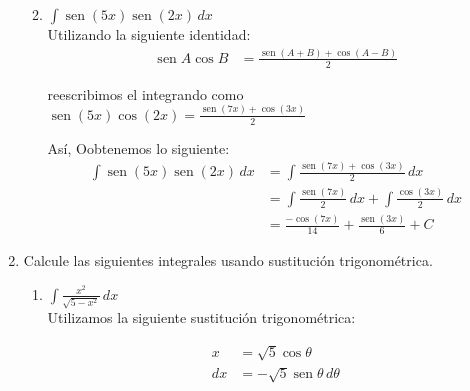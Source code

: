 \documentclass[a4paper,10pt]{article}
\newcommand{\dis}{\displaystyle}
\def\sin{\operatorname{sen}}
\begin{document}
\begin{enumerate}
\begin{enumerate}[label=\emph{\alph*)}]
\newpage
\item $\dis \int \sin(5x) \sin(2x)\, dx$\\

Utilizando la siguiente identidad:
\begin{align*}
 \dis \sin A \cos B  &=    \frac{\sin (A+B) + \cos (A-B)}{2}
\end{align*}

reescribimos el integrando como $\dis \sin(5x)\cos(2x) = \frac{\sin(7x)+\cos(3x)}{2}$

\dotfill [1 punto]

Así, Oobtenemos lo siguiente:
\begin{align*}
 \dis \int \sin(5x) \sin(2x)\, dx  &=    \dis \int \frac{\sin (7x) + \cos (3x)}{2} \, dx\\
 								   &=    \dis \int \frac{\sin (7x)}{2} \, dx + \int \frac{\cos (3x)}{2} \, dx\\
                                   &=    \dis \frac{-\cos (7x)}{14} + \frac{\sin (3x)}{6} + C
\end{align*}
\dotfill [1 punto]




\end{enumerate}


\newpage
\item Calcule las siguientes integrales usando sustituci\'{o}n
trigonom\'{e}trica.
\begin{enumerate}[label=\emph{\alph*)}]
\item $\dis \int \frac{x^2}{\sqrt{5-x^2}}\, dx$\\

Utilizamos la siguiente sustitución trigonométrica:\\

\begin{minipage}{.3\textwidth}
\raggedright
\begin{align*}
x  &= \sqrt{5}\cos \theta      \\
dx &= -\sqrt{5}\sin \theta  \, d\theta
\end{align*}
\end{minipage}%
\begin{minipage}{.3\textwidth}
\raggedleft
{}
\end{minipage}
\end{enumerate}
\end{enumerate}
\end{document}
